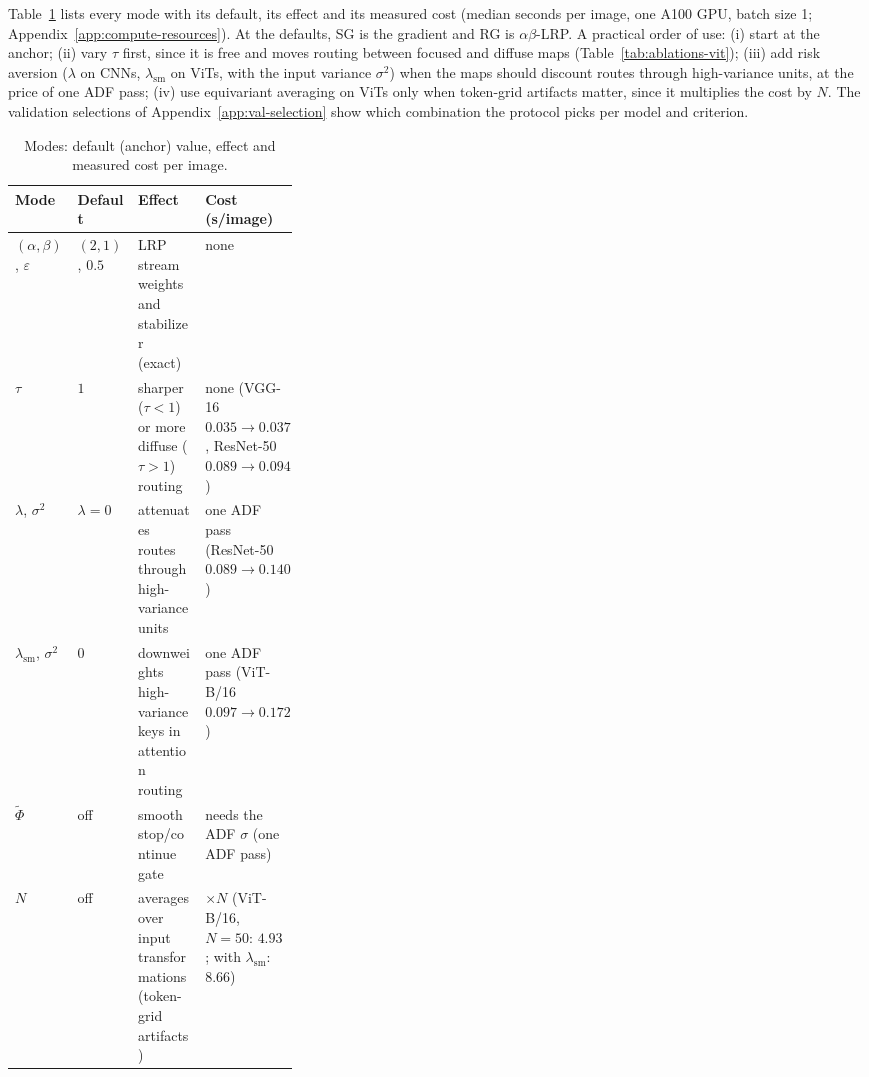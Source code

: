 \documentclass[twoside]{article}
\newcommand{\1}{\mathbf{1}}
\begin{document}
Table~\ref{tab:mode-guide} lists every mode with its default, its effect and its measured cost
(median seconds per image, one A100 GPU, batch size 1; Appendix~\ref{app:compute-resources}). At
the defaults, \ac{SG} is the gradient and \ac{RG} is $\alpha\beta$-\ac{LRP}. A practical order of
use: (i) start at the anchor; (ii) vary $\tau$ first, since it is free and moves routing between
focused and diffuse maps (Table~\ref{tab:ablations-vit}); (iii) add risk aversion ($\lambda$ on
\acp{CNN}, $\lambda_{\mathrm{sm}}$ on \acp{ViT}, with the input variance $\sigma^2$) when the maps
should discount routes through high-variance units, at the price of one \ac{ADF} pass; (iv) use
equivariant averaging on \acp{ViT} only when token-grid artifacts matter, since it multiplies the
cost by $N$. The validation selections of Appendix~\ref{app:val-selection} show which combination
the protocol picks per model and criterion.

\begin{table}[H]
    \centering
    \caption{Modes: default (anchor) value, effect and measured cost per image.}
    \label{tab:mode-guide}
    \small
    \setlength{\tabcolsep}{3pt}
    \begin{tabularx}{\linewidth}{@{}l l >{\raggedright\arraybackslash}X
        >{\raggedright\arraybackslash}p{0.33\linewidth}@{}}
        \toprule
        Mode & Default & Effect & Cost (s/image) \\
        \midrule
        $(\alpha,\beta)$, $\varepsilon$ & $(2,1)$, $0.5$ & \ac{LRP} stream weights and stabilizer (exact) &
        none \\
        $\tau$ & $1$ & sharper ($\tau<1$) or more diffuse ($\tau>1$) routing & none (VGG-16
        $0.035\to0.037$, ResNet-50 $0.089\to0.094$) \\
        $\lambda$, $\sigma^2$ & $\lambda{=}0$ & attenuates routes through high-variance units & one
        \ac{ADF} pass (ResNet-50 $0.089\to0.140$) \\
        $\lambda_{\mathrm{sm}}$, $\sigma^2$ & $0$ & downweights high-variance keys in attention routing &
        one \ac{ADF} pass (ViT-B/16 $0.097\to0.172$) \\
        $\tilde\Phi$ & off & smooth stop/continue gate & needs the \ac{ADF} $\sigma$ (one \ac{ADF} pass) \\
        $N$ & off & averages over input transformations (token-grid artifacts) & $\times N$ (ViT-B/16,
        $N{=}50$: $4.93$; with $\lambda_{\mathrm{sm}}$: $8.66$) \\
        \bottomrule
    \end{tabularx}
\end{table}
\end{document}
